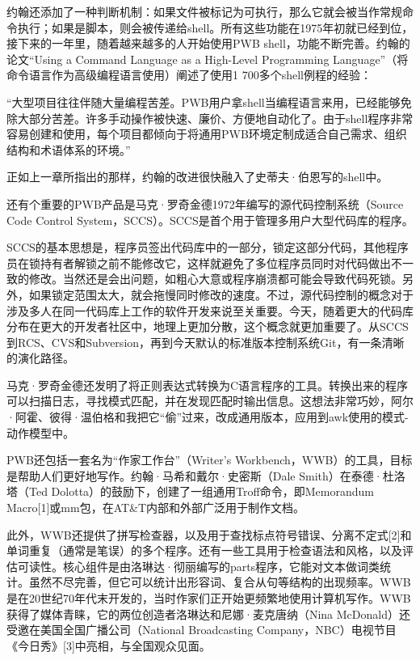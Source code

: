 \documentclass[a4paper,12pt,UTF8,twoside]{ctexbook}
\begin{document}
约翰还添加了一种判断机制：如果文件被标记为可执行，那么它就会被当作常规命令执行；如果是脚本，则会被传递给shell。所有这些功能在1975年初就已经到位，接下来的一年里，随着越来越多的人开始使用PWB shell，功能不断完善。约翰的论文“Using a Command Language as a High-Level Programming Language”（将命令语言作为高级编程语言使用）阐述了使用1 700多个shell例程的经验：

“大型项目往往伴随大量编程苦差。PWB用户拿shell当编程语言来用，已经能够免除大部分苦差。许多手动操作被快速、廉价、方便地自动化了。由于shell程序非常容易创建和使用，每个项目都倾向于将通用PWB环境定制成适合自己需求、组织结构和术语体系的环境。”



正如上一章所指出的那样，约翰的改进很快融入了史蒂夫·伯恩写的shell中。

还有个重要的PWB产品是马克·罗奇金德1972年编写的源代码控制系统（Source Code Control System，SCCS）。SCCS是首个用于管理多用户大型代码库的程序。

SCCS的基本思想是，程序员签出代码库中的一部分，锁定这部分代码，其他程序员在锁持有者解锁之前不能修改它，这样就避免了多位程序员同时对代码做出不一致的修改。当然还是会出问题，如粗心大意或程序崩溃都可能会导致代码死锁。另外，如果锁定范围太大，就会拖慢同时修改的速度。不过，源代码控制的概念对于涉及多人在同一代码库上工作的软件开发来说至关重要。今天，随着更大的代码库分布在更大的开发者社区中，地理上更加分散，这个概念就更加重要了。从SCCS到RCS、CVS和Subversion，再到今天默认的标准版本控制系统Git，有一条清晰的演化路径。

马克·罗奇金德还发明了将正则表达式转换为C语言程序的工具。转换出来的程序可以扫描日志，寻找模式匹配，并在发现匹配时输出信息。这想法非常巧妙，阿尔·阿霍、彼得·温伯格和我把它“偷”过来，改成通用版本，应用到awk使用的模式-动作模型中。

PWB还包括一套名为“作家工作台”（Writer’s Workbench，WWB）的工具，目标是帮助人们更好地写作。约翰·马希和戴尔·史密斯（Dale Smith）在泰德·杜洛塔（Ted Dolotta）的鼓励下，创建了一组通用Troff命令，即Memorandum Macro[1]或mm包，在AT\&T内部和外部广泛用于制作文档。

此外，WWB还提供了拼写检查器，以及用于查找标点符号错误、分离不定式[2]和单词重复（通常是笔误）的多个程序。还有一些工具用于检查语法和风格，以及评估可读性。核心组件是由洛琳达·彻丽编写的parts程序，它能对文本做词类统计。虽然不尽完善，但它可以统计出形容词、复合从句等结构的出现频率。WWB是在20世纪70年代末开发的，当时作家们正开始更频繁地使用计算机写作。WWB获得了媒体青睐，它的两位创造者洛琳达和尼娜·麦克唐纳（Nina McDonald）还受邀在美国全国广播公司（National Broadcasting Company，NBC）电视节目《今日秀》[3]中亮相，与全国观众见面。
\end{document}
